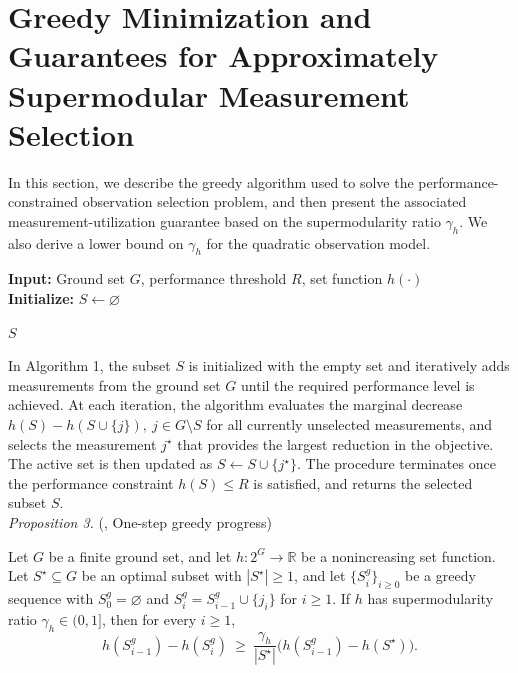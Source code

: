 \documentclass[letterpaper, 10 pt, conference]{ieeeconf}  %
\begin{document}
\section{Greedy Minimization and Guarantees for Approximately Supermodular Measurement Selection}

In this section, we describe the greedy algorithm used to solve the performance-constrained observation selection problem, and then present the associated measurement-utilization guarantee based on the supermodularity ratio \(\gamma_h\). We also derive a lower bound on \(\gamma_h\) for the quadratic observation model.

\begin{algorithm}[hbt!]
    \caption{Greedy measurement selection for Problem (5)}
    \label{alg:greedy_t}
    \textbf{Input:} Ground set \(G\), performance threshold \(R\), set function \(h(\cdot)\) \\
    \textbf{Initialize:} \(S \gets \varnothing\)
    
    \State \Return \(S\)
\end{algorithm}

In Algorithm 1, the subset $S$ is initialized with the empty set and iteratively adds measurements from the ground set \(G\) until the required performance level is achieved. At each iteration, the algorithm evaluates the marginal decrease $h(S)-h(S\cup\{j\}),\ j\in G\setminus S$ for all currently unselected measurements, and selects the measurement \(j^\star\) that provides the largest reduction in the objective. The active set is then updated as \(S \gets S\cup\{j^\star\}\). The procedure terminates once the performance constraint \(h(S)\le R\) is satisfied, and returns the selected subset \(S\). \\

\noindent \textit{Proposition 3.} (\cite{c22}, One-step greedy progress)

Let \(G\) be a finite ground set, and let \(h:2^{G}\to\mathbb{R}\) be a nonincreasing set function. Let \(S^\star\subseteq G\) be an optimal subset with \(|S^\star|\ge 1\), and let \(\{S^g_i\}_{i\ge 0}\) be a greedy sequence with \(S^g_0=\varnothing\) and \(S^g_i=S^g_{i-1}\cup\{j_i\}\) for \(i\ge 1\). If \(h\) has supermodularity ratio \(\gamma_h\in(0,1]\), then for every \(i\ge 1\),
\begin{equation}
h(S^g_{i-1})-h(S^g_i)
~\ge~
\frac{\gamma_h}{|S^\star|}
\Big(h(S^g_{i-1})-h(S^\star)\Big).
\end{equation}
\end{document}
